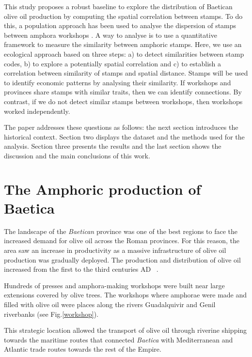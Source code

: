 \documentclass[review]{elsarticle}
\begin{document}
This study proposes a robust baseline to explore the distribution of Baetican olive oil production by computing the spatial correlation between stamps. To do this, a population approach has been used to analyse the dispersion of stamps between amphora workshops \citep{rubio-campillo_ecology_2018}.  A way to analyse is to use a quantitative framework to measure the similarity between amphoric stamps. Here, we use an ecological approach based on three steps: a) to detect similarities between stamp codes, b) to explore a potentially spatial correlation and c) to establish a correlation between similarity of stamps and spatial distance. Stamps will be used to identify economic patterns by analysing their similarity. If workshops and provinces share stamps with similar traits, then we can identify connections. By contrast, if we do not detect similar stamps between workshops, then workshops worked independently. 

The paper addresses these questions as follows: the next section introduces the historical context. Section two displays the dataset and the methods used for the analysis. Section three presents the results and the last section shows the discussion and the main conclusions of this work. 


\section{The Amphoric production of Baetica}

The landscape of the \textit{Baetican} province was one of the best regions to face the increased demand for olive oil across the Roman provinces. For this reason, the area saw an increase in productivity as a massive infrastructure of olive oil production was gradually deployed. The production and distribution of olive oil increased from the first to the third centuries AD ~\citep{remesal_concierto}. 


Hundreds of presses and amphora-making workshops were built near large extensions covered by olive trees. The workshops where amphorae were made and filled with olive oil were places along the rivers Guadalquivir and Genil riverbanks (see Fig.\ref{workshop}).

This strategic location allowed the transport of olive oil through riverine shipping towards the maritime routes that connected \textit{Baetica} with Mediterranean and Atlantic trade routes towards the rest of the Empire\citep{garcia_vargas_enrique_formal_2010}.
\end{document}
